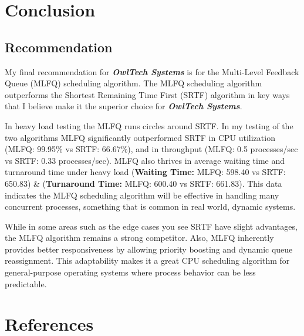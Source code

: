 \documentclass[11pt]{article}
\begin{document}
\section{Conclusion}
\subsection{Recommendation}
My final recommendation for \textbf{\textit{OwlTech Systems}} is for the Multi-Level Feedback Queue (MLFQ) scheduling algorithm. The MLFQ scheduling algorithm outperforms the Shortest Remaining Time First (SRTF) algorithm in key ways that I believe make it the superior choice for \textbf{\textit{OwlTech Systems}}.

In heavy load testing the MLFQ runs circles around SRTF. In my testing of the two algorithms MLFQ significantly outperformed  SRTF in CPU utilization (MLFQ: 99.95\% vs SRTF: 66.67\%), and in throughput (MLFQ: 0.5 processes/sec vs SRTF: 0.33 processes/sec). MLFQ also thrives in average waiting time and turnaround time under heavy load (\textbf{Waiting Time:} MLFQ: 598.40 vs SRTF: 650.83) \& (\textbf{Turnaround Time:} MLFQ: 600.40 vs SRTF: 661.83).
This data indicates the MLFQ scheduling algorithm will be effective in handling many concurrent processes, something that is common in real world, dynamic systems.

While in some areas such as the edge cases you see SRTF have slight advantages, the MLFQ algorithm remains a strong competitor. Also, MLFQ inherently provides better responsiveness by allowing priority boosting and dynamic queue reassignment. This adaptability makes it a great CPU scheduling algorithm for general-purpose operating systems where process behavior can be less predictable.

\nocite{*}
\newpage
\section{References}


\end{document}
